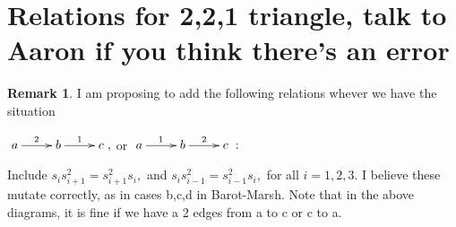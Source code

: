 \documentclass[11pt]{amsart}
\theoremstyle{definition}
\newtheorem{rem}[thm]{Remark}
\begin{document}
\section{Relations for 2,2,1 triangle, talk to Aaron if you think there's an error}

\begin{rem}
\label{even_more_relations}
I am proposing to add the following relations whever we have the situation

$\xymatrix{a \ar[r]^2 & b \ar[r]^1 & c},$ or $\xymatrix{a \ar[r]^1 & b \ar[r]^2 & c}:$

Include $s_is_{i+1}^2 = s_{i+1}^2s_i,$ and $s_is_{i-1}^2 = s_{i-1}^2s_i,$ for all $i = 1,2,3.$ I believe these mutate correctly, as in cases b,c,d in Barot-Marsh. Note that in the above diagrams, it is fine if we have a 2 edges from a to c or c to a.
\end{rem}
\end{document}
